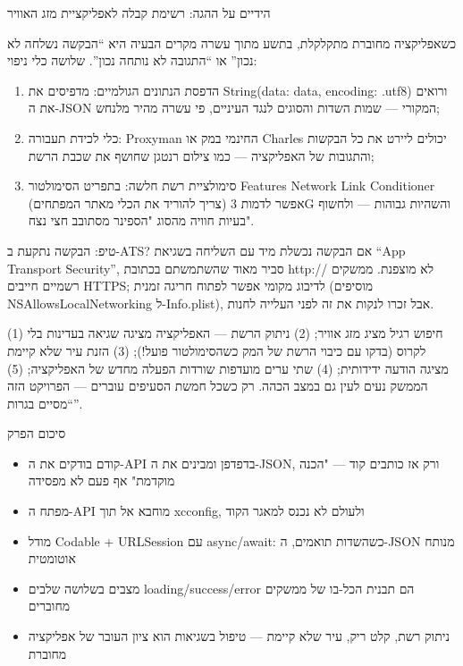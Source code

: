 \begin{tcbpractice}{הידיים על ההגה: רשימת קבלה לאפליקציית מזג האוויר}

כשאפליקציה מחוברת מתקלקלת, בתשע מתוך עשרה מקרים הבעיה היא “הבקשה נשלחה לא נכון” או “התגובה לא נותחה נכון”. שלושה כלי ניפוי:

\begin{enumerate}
  \item הדפסת הנתונים הגולמיים: מדפיסים את String(data: data, encoding: .utf8) ורואים את ה-JSON המקורי — שמות השדות והסוגים לנגד העיניים, פי עשרה מהיר מלנחש;
  \item כלי לכידת תעבורה: Proxyman החינמי במק או Charles יכולים ליירט את כל הבקשות והתגובות של האפליקציה — כמו צילום רנטגן שחושף את שכבת הרשת;
  \item סימולציית רשת חלשה: בתפריט הסימולטור Features Network Link Conditioner (צריך להוריד את הכלי מאתר המפתחים) אפשר לדמות 3G והשהיות גבוהות — ולחשוף בעיות חוויה מהסוג "הספינר מסתובב חצי נצח".
\end{enumerate}

\begin{tcbinfo}{טיפ: הבקשה נתקעת ב-ATS?}
אם הבקשה נכשלת מיד עם השליחה בשגיאת “App Transport Security”, סביר מאוד שהשתמשתם בכתובת http:// לא מוצפנת. ממשקים רשמיים חייבים HTTPS; לדיבוג מקומי אפשר לפתוח חריגה זמנית (מוסיפים NSAllowsLocalNetworking ל-Info.plist), אבל זכרו לנקות את זה לפני העלייה לחנות.

\end{tcbinfo}

(1) חיפוש רגיל מציג מזג אוויר; (2) ניתוק הרשת — האפליקציה מציגה שגיאה בעדינות בלי לקרוס (בדקו עם כיבוי הרשת של המק כשהסימולטור פועל!); (3) הזנת עיר שלא קיימת מציגה הודעה ידידותית; (4) שתי ערים מועדפות שורדות הפעלה מחדש של האפליקציה; (5) הממשק נעים לעין גם במצב הכהה. רק כשכל חמשת הסעיפים עוברים — הפרויקט הזה “מסיים בגרות”.

\end{tcbpractice}

\begin{tcbsummary}{סיכום הפרק}
\begin{itemize}
  \item קודם בודקים את ה-API בדפדפן ומבינים את ה-JSON, ורק אז כותבים קוד — "הכנה מוקדמת" אף פעם לא מפסידה
  \item מפתח ה-API מוחבא אל תוך xcconfig, ולעולם לא נכנס למאגר הקוד
  \item מודל Codable + URLSession עם async/await: כשהשדות תואמים, ה-JSON מנותח אוטומטית
  \item מצבים בשלושה שלבים loading/success/error הם תבנית הכל-בו של ממשקים מחוברים
  \item ניתוק רשת, קלט ריק, עיר שלא קיימת — טיפול בשגיאות הוא ציון העובר של אפליקציה מחוברת
\end{itemize}

\end{tcbsummary}
